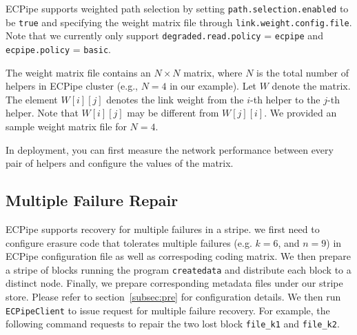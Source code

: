 \documentclass[letterpaper,12pt]{article}
\newcommand{\sysname}{{\sf\small ECPipe}\xspace}
\begin{document}
\sysname supports weighted path selection by setting
{\tt path.selection.enabled} to be {\tt true} and specifying the weight matrix
file through {\tt link.weight.config.file}.  Note that we currently only
support {\tt degraded.read.policy} = {\tt ecpipe} and {\tt ecpipe.policy} =
{\tt basic}.



The weight matrix file contains an $N \times N$ matrix, where $N$ is the total
number of helpers in ECPipe cluster (e.g., $N=4$ in our example).  Let $W$ denote the matrix. The element
$W[i][j]$ denotes the link weight from the $i$-th helper to the $j$-th helper.
Note that $W[i][j]$ may be different from $W[j][i]$.  We provided an sample
weight matrix file  for $N=4$.


In deployment, you can first measure the network performance between every
pair of helpers and configure the values of the matrix.

\subsection{Multiple Failure Repair}

\sysname supports recovery for multiple failures in a stripe. we first need to configure erasure code
that tolerates multiple failures (e.g. $k = 6$, and $n = 9$) in \sysname configuration
file as well as correspoding coding matrix.
We then prepare a stripe of blocks running the program {\tt createdata} and
distribute each block to a distinct node. Finally, we prepare corresponding metadata
files under our stripe store. Please refer to section~\ref{subsec:pre} for configuration details. 
We then run {\tt ECPipeClient} to issue request
for multiple failure recovery. For example, the following command requests to
repair the two lost block {\tt file\_k1} and {\tt file\_k2}.
\end{document}
